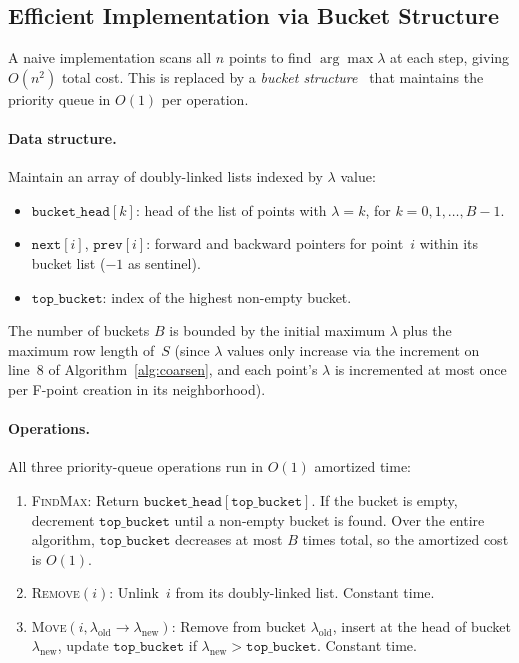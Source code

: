 \documentclass[11pt]{article}
\begin{document}
\subsection{Efficient Implementation via Bucket Structure}

A naive implementation scans all $n$ points to find $\arg\max \lambda$
at each step, giving $O(n^2)$ total cost.  This is replaced by a
\emph{bucket structure}~\cite{Stuben2001,HensonYang2002} that maintains
the priority queue in $O(1)$ per operation.

\paragraph{Data structure.}
Maintain an array of doubly-linked lists indexed by $\lambda$ value:
\begin{itemize}
  \item $\texttt{bucket\_head}[k]$: head of the list of points with
    $\lambda = k$, for $k = 0, 1, \ldots, B-1$.
  \item $\texttt{next}[i]$, $\texttt{prev}[i]$: forward and backward
    pointers for point~$i$ within its bucket list ($-1$ as sentinel).
  \item $\texttt{top\_bucket}$: index of the highest non-empty bucket.
\end{itemize}
The number of buckets $B$ is bounded by the initial maximum $\lambda$
plus the maximum row length of~$S$ (since $\lambda$ values only increase
via the increment on line~8 of Algorithm~\ref{alg:coarsen}, and each
point's $\lambda$ is incremented at most once per F-point creation in
its neighborhood).

\paragraph{Operations.}
All three priority-queue operations run in $O(1)$ amortized time:
\begin{enumerate}
  \item \textsc{FindMax}: Return $\texttt{bucket\_head}[\texttt{top\_bucket}]$.
    If the bucket is empty, decrement $\texttt{top\_bucket}$ until a
    non-empty bucket is found.  Over the entire algorithm, $\texttt{top\_bucket}$
    decreases at most $B$ times total, so the amortized cost is $O(1)$.
  \item \textsc{Remove}$(i)$: Unlink~$i$ from its doubly-linked list.
    Constant time.
  \item \textsc{Move}$(i, \lambda_{\mathrm{old}} \to \lambda_{\mathrm{new}})$:
    Remove from bucket $\lambda_{\mathrm{old}}$, insert at the head of
    bucket $\lambda_{\mathrm{new}}$, update $\texttt{top\_bucket}$ if
    $\lambda_{\mathrm{new}} > \texttt{top\_bucket}$.  Constant time.
\end{enumerate}
\end{document}
